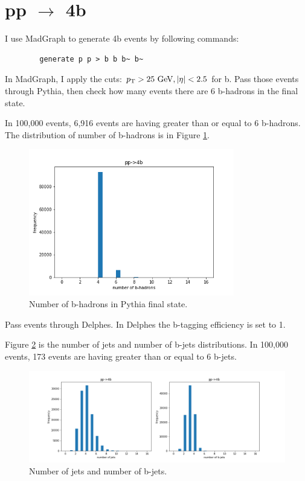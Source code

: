 \documentclass[12pt]{article}
\begin{document}
\section{\texorpdfstring{pp $\to $ 4b}{pp to 4b}}%
\label{sec:pp_4b}
	I use MadGraph to generate 4b events by following commands:
	\begin{verbatim}
		generate p p > b b b~ b~ 
	\end{verbatim}
	In MadGraph, I apply the cuts: $p_\text{T}>\text{25 GeV}, \abs{\eta}<2.5$ for b. Pass those events through Pythia, then check how many events there are 6 b-hadrons in the final state.

	In 100,000 events, 6,916 events are having greater than or equal to 6 b-hadrons. The distribution of number of b-hadrons is in Figure \ref{fig:number_of_b_hadron}.
	\begin{figure}[htpb]
		\centering
		\includegraphics[width=0.8\textwidth]{number_of_b-hadrons.png}
		\caption{Number of b-hadrons in Pythia final state.}
		\label{fig:number_of_b_hadron}
	\end{figure}

	Pass events through Delphes. In Delphes the b-tagging efficiency is set to 1.

	Figure \ref{fig:number_of_jet} is the number of jets and number of b-jets distributions. In 100,000 events, 173 events are having greater than or equal to 6 b-jets.
	\begin{figure}[htpb]
		\centering
		\includegraphics[width=1\textwidth]{number_of_b-jets.png}
		\caption{Number of jets and number of b-jets.}
		\label{fig:number_of_jet}
	\end{figure}
\end{document}
